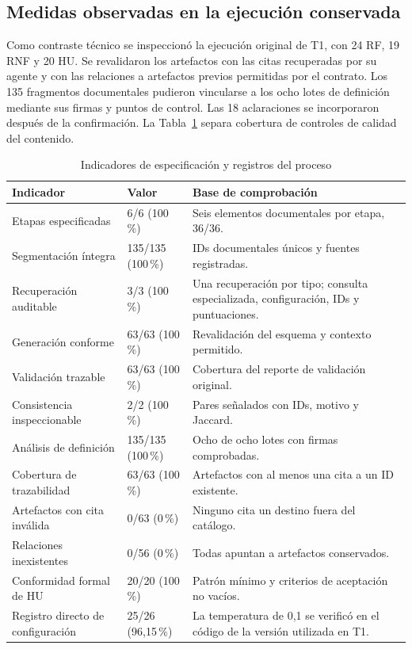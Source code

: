 \subsection{Medidas observadas en la ejecución conservada}

Como contraste técnico se inspeccionó la ejecución original de T1, con 24 RF, 19 RNF y 20 HU. Se revalidaron los artefactos con las citas recuperadas por su agente y con las relaciones a artefactos previos permitidas por el contrato. Los 135 fragmentos documentales pudieron vincularse a los ocho lotes de definición mediante sus firmas y puntos de control. Las 18 aclaraciones  se incorporaron después de la confirmación. La Tabla~\ref{tab:medidas-oe2-observadas} separa cobertura de controles de calidad del contenido.

\begin{table}[H]
\centering
\small
{}
\setlength{\tabcolsep}{4pt}
\caption{Indicadores de especificación y registros del proceso}
\label{tab:medidas-oe2-observadas}
\begin{tabular}{>{\RaggedRight\arraybackslash}p{4.8cm}p{2.9cm}>{\RaggedRight\arraybackslash}p{5.9cm}}
  \toprule
  Indicador & Valor & Base de comprobación \\
  \midrule
  Etapas especificadas & 6/6 (100\,\%) & Seis elementos documentales por etapa, 36/36. \\
  Segmentación íntegra & 135/135 (100\,\%) & IDs documentales únicos y fuentes registradas. \\
  Recuperación auditable & 3/3 (100\,\%) & Una recuperación por tipo; consulta especializada, configuración, IDs y puntuaciones. \\
  Generación conforme & 63/63 (100\,\%) & Revalidación del esquema y contexto permitido. \\
  Validación trazable & 63/63 (100\,\%) & Cobertura del reporte de validación original. \\
  Consistencia inspeccionable & 2/2 (100\,\%) & Pares señalados con IDs, motivo y Jaccard. \\
  Análisis de definición & 135/135 (100\,\%) & Ocho de ocho lotes con firmas comprobadas. \\
  Cobertura de trazabilidad & 63/63 (100\,\%) & Artefactos con al menos una cita a un ID existente. \\
  Artefactos con cita inválida & 0/63 (0\,\%) & Ninguno cita un destino fuera del catálogo. \\
  Relaciones inexistentes & 0/56 (0\,\%) & Todas apuntan a artefactos conservados. \\
  Conformidad formal de HU & 20/20 (100\,\%) & Patrón mínimo y criterios de aceptación no vacíos. \\
  Registro directo de configuración & 25/26 (96,15\,\%) & La temperatura de 0,1 se verificó en el código de la versión utilizada en T1. \\
  \bottomrule
\end{tabular}
\end{table}


